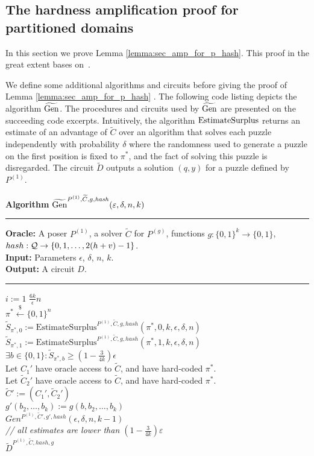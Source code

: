 %
\subsection{The hardness amplification proof for partitioned domains}
\label{st:amplification_proof}
In this section we prove Lemma \ref{lemma:sec_amp_for_p_hash}. This proof in the great extent bases on~\cite{holenstein2011general}.

We define some additional algorithms and circuits before giving the proof of Lemma \ref{lemma:sec_amp_for_p_hash} .
The following code listing depicts the algorithm $\widetilde{\operatorname{\text{Gen}}}$.
The procedures and circuits used by $\widetilde{\operatorname{\text{Gen}}}$ are presented on the succeeding code excerpts.
Intuitively, the algorithm $\operatorname{\text{EstimateSurplus}}$ returns an estimate of an advantage of $\widetilde{C}$
over an algorithm that solves each puzzle independently with probability $\delta$
where the randomness used to generate a puzzle on the first position is fixed to $\pi^*$,
and the fact of solving this puzzle is disregarded.
The circuit $\widetilde{D}$ outputs a solution $(q,y)$ for a puzzle defined by $P^{(1)}$.

\begin{codeblock}
  \textbf{Algorithm} $\widetilde{\operatorname{\text{Gen}}}^{P^{(1)}, \widetilde{C}, g, \mathit{hash}}(\varepsilon, \delta, n, k)$
  \medskip \hrule
  \textbf{Oracle:} A poser $P^{(1)}$, a solver $\widetilde{C}$ for $P^{(g)}$, functions $g: \{0,1\}^{k} \rightarrow \{0,1\}$, $hash:\mathcal{Q} \rightarrow \{0,1, \dots, 2(h + v) - 1\}$. \\
  \textbf{Input:}  Parameters $\epsilon$, $\delta$, $n$, $k$.\\
  \textbf{Output:} A circuit $D$.
  \medskip\hrule
  \For $i:=1$ \To $\frac{6k}{\epsilon}n$ \Do \\
  \IndI $\pi^* \xleftarrow{\$} \{0,1\}^{n}$\\
  \IndI $\widetilde{S}_{\pi^*,0} := \text{EstimateSurplus}^{P^{(1)},  \widetilde{C}, g, hash}(\pi^*, 0, k, \epsilon, \delta,n)$\\
  \IndI $\widetilde{S}_{\pi^*,1} := \text{EstimateSurplus}^{P^{(1)},  \widetilde{C}, g, hash}(\pi^*, 1, k, \epsilon, \delta,n)$\\
  \IndI \If $ \exists b \in \{0,1\}: \widetilde{S}_{\pi^*,b} \geq (1 - \frac{3}{4k}) \epsilon$ \Then \\
  \IndII Let $C_1'$ have oracle access to $\widetilde{C}$, and have hard-coded $\pi^*$. \\
  \IndII Let $\widetilde{C}_2'$ have oracle access to $\widetilde{C}$, and have hard-coded $\pi^*$. \\
  \IndII $\widetilde{C}' := (C_1', \widetilde{C}_2')$ \\
  \IndII $g'(b_2, \dots, b_k) := g(b, b_2, \dots, b_k)$\\
  \IndII\Return $Gen^{P^{(1)}, \widetilde{C}', g', hash}(\epsilon, \delta, n, k-1)$ \\
  \textit{// all estimates are lower than $(1-\frac{3}{4k})\varepsilon$}\\
  \Return $\widetilde{D}^{P^{(1)}, \widetilde{C}, hash, g}$
\end{codeblock}

